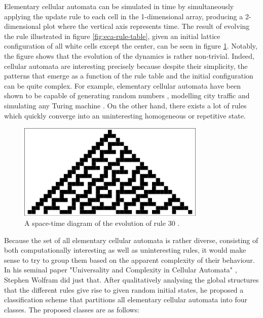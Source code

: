 \documentclass[12pt]{article}
\begin{document}
Elementary cellular automata can be simulated in time by simultaneously applying the update rule to each cell in the 1-dimensional array, producing a 2-dimensional plot where the vertical axis represents time. The result of evolving the rule illustrated in figure \ref{fig:eca-rule-table}, given an initial lattice configuration of all white cells except the center, can be seen in figure \ref{fig:eca-rule-dynamics}. Notably, the figure shows that the evolution of the dynamics is rather non-trivial. Indeed, cellular automata are interesting precisely because despite their simplicity, the patterns that emerge as a function of the rule table and the initial configuration can be quite complex. For example, elementary cellular automata have been shown to be capable of generating random numbers \cite{eca-random-gen}, modelling city traffic \cite{eca-city-traffic} and simulating any Turing machine \cite{eca-universal}. On the other hand, there exists a lot of rules which quickly converge into an uninteresting homogeneous or repetitive state. 

\begin{figure} [!h]
\begin{center}
\includegraphics[width=0.8\textwidth]{eca-dynamics-example}
\caption{A space-time diagram of the evolution of rule 30 \cite{weisstein-eca}.}
\label{fig:eca-rule-dynamics}
\end{center}
\end{figure} 

Because the set of all elementary cellular automata is rather diverse, consisting of both computationally interesting as well as uninteresting rules, it would make sense to try to group them based on the apparent complexity of their behaviour. In his seminal paper "Universality and Complexity in Cellular Automata" \cite{wolfram-classification}, Stephen Wolfram did just that. After qualitatively analysing the global structures that the different rules give rise to given random initial states, he proposed a classification scheme that partitions all elementary cellular automata into four classes. The proposed classes are as follows:
\end{document}
